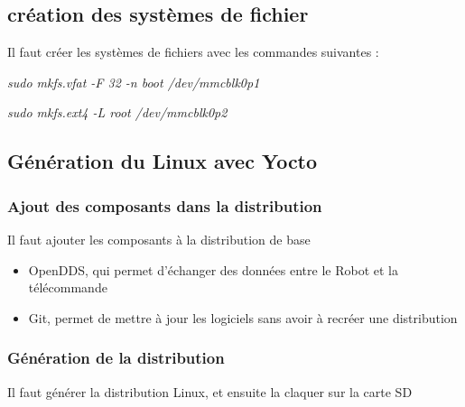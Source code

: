 \subsection{création des systèmes de fichier}

Il faut créer les systèmes de fichiers avec les commandes suivantes : 


\textit{sudo mkfs.vfat -F 32 -n boot /dev/mmcblk0p1}

\textit{sudo mkfs.ext4 -L root /dev/mmcblk0p2}



\subsection{Génération du Linux avec Yocto}


\subsubsection{Ajout des composants dans la distribution}

Il faut ajouter les composants à la distribution de base
\begin{itemize}

\item OpenDDS, qui permet d'échanger des données entre le Robot et la télécommande

\item Git, permet de mettre à jour les logiciels sans avoir à recréer une distribution

\end{itemize}

\subsubsection{Génération de la distribution}
Il faut générer la distribution Linux, et ensuite la claquer sur la carte SD


